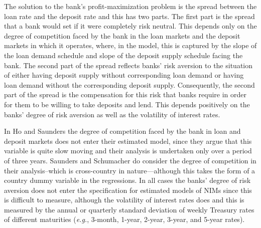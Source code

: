 \documentclass[11pt]{article}
\begin{document}
The solution to the bank's profit-maximization problem is the spread between the loan rate and the deposit rate and this has two parts. The first part is the spread that a bank would set if it were completely risk neutral. This depends only on the degree of competition faced by the bank in the loan markets and the deposit markets in which it operates, where, in the model, this is captured by the slope of the loan demand schedule and slope of the deposit supply schedule facing the bank. The second part of the spread reflects banks' risk aversion to the situation of either having deposit supply without corresponding loan demand or having loan demand without the corresponding deposit supply. Consequently, the second part of the spread is the compensation for this risk that banks require in order for them to be willing to take deposits and lend. This depends positively on the banks' degree of risk aversion as well as the volatility of interest rates.

In Ho and Saunders the degree of competition faced by the bank in loan and deposit markets does not enter their estimated model, since they argue that this variable is quite slow moving and their analysis is undertaken only over a period of three years.  Saunders and Schumacher do consider the degree of competition in their analysis--which is cross-country in nature---although this takes the form of a country dummy variable in the regressions. In all cases the banks' degree of risk aversion does not enter the specification for estimated models of NIMs since this is difficult to measure, although the volatility of interest rates does and this is measured by the annual or quarterly standard deviation of weekly Treasury rates of different maturities (\textit{e.g.}, 3-month, 1-year, 2-year, 3-year, and 5-year rates).
\end{document}
